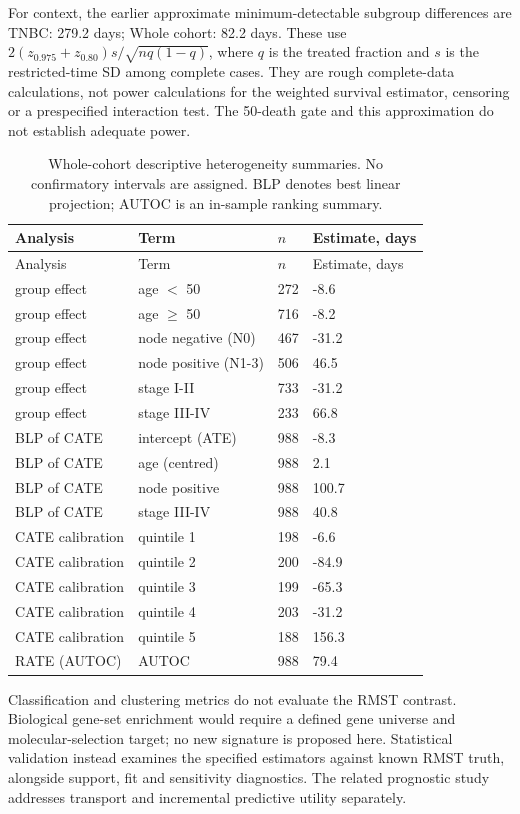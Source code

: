 \documentclass[12pt,letterpaper]{article}
\begin{document}
For context, the earlier approximate minimum-detectable subgroup differences are TNBC: 279.2 days; Whole cohort: 82.2 days. These use $2(z_{0.975}+z_{0.80})s/\sqrt{nq(1-q)}$, where $q$ is the treated fraction and $s$ is the restricted-time SD among complete cases. They are rough complete-data calculations, not power calculations for the weighted survival estimator, censoring or a prespecified interaction test. The 50-death gate and this approximation do not establish adequate power.
\begin{longtable}{p{1.45in}p{2.55in}p{0.6in}p{1.15in}}
\caption{Whole-cohort descriptive heterogeneity summaries. No confirmatory intervals are assigned. BLP denotes best linear projection; AUTOC is an in-sample ranking summary.}\\
\toprule
Analysis & Term & $n$ & Estimate, days \\
\midrule\endfirsthead
\toprule
Analysis & Term & $n$ & Estimate, days \\
\midrule\endhead
\bottomrule\endfoot
group effect & age $<$ 50 & 272 & -8.6 \\
group effect & age $\ge$ 50 & 716 & -8.2 \\
group effect & node negative (N0) & 467 & -31.2 \\
group effect & node positive (N1-3) & 506 & 46.5 \\
group effect & stage I-II & 733 & -31.2 \\
group effect & stage III-IV & 233 & 66.8 \\
BLP of CATE & intercept (ATE) & 988 & -8.3 \\
BLP of CATE & age (centred) & 988 & 2.1 \\
BLP of CATE & node positive & 988 & 100.7 \\
BLP of CATE & stage III-IV & 988 & 40.8 \\
CATE calibration & quintile 1 & 198 & -6.6 \\
CATE calibration & quintile 2 & 200 & -84.9 \\
CATE calibration & quintile 3 & 199 & -65.3 \\
CATE calibration & quintile 4 & 203 & -31.2 \\
CATE calibration & quintile 5 & 188 & 156.3 \\
RATE (AUTOC) & AUTOC & 988 & 79.4 \\
\end{longtable}
Classification and clustering metrics do not evaluate the RMST contrast. Biological gene-set
enrichment would require a defined gene universe and molecular-selection target; no new signature is
proposed here. Statistical validation instead examines the specified estimators against known RMST truth,
alongside support, fit and sensitivity diagnostics. The related prognostic study addresses transport and
incremental predictive utility separately.
\end{document}
